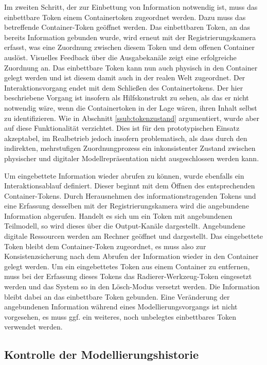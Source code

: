 Im zweiten Schritt, der zur Einbettung von Information notwendig ist, muss das einbettbare Token einem Containertoken zugeordnet werden. Dazu muss das betreffende Container-Token geöffnet werden. Das einbettbaren Token, an das bereits Information gebunden wurde, wird erneut mit der Registrierungskamera erfasst, was eine Zuordnung zwischen diesem Token und dem offenen Container auslöst. Visuelles Feedback über die Ausgabekanäle zeigt eine erfolgreiche Zuordnung an. Das einbettbare Token kann nun auch physisch in den Container gelegt werden und ist diesem damit auch in der realen Welt zugeordnet. Der Interaktionsvorgang endet mit dem Schließen des Containertokens. Der hier beschriebene Vorgang ist insofern als Hilfskonstrukt zu sehen, als das er nicht notwendig wäre, wenn die Containertoken in der Lage wären, ihren Inhalt selbst zu identifizieren. Wie in Abschnitt \ref{ssub:tokenzustand} argumentiert, wurde aber auf diese Funktionalität verzichtet. Dies ist für den prototypischen Einsatz akzeptabel, im Realbetrieb jedoch insofern problematisch, als dass durch den indirekten, mehrstufigen Zuordnungprozess ein inkonsistenter Zustand zwischen physischer und digitaler Modellrepräsentation nicht ausgeschlossen werden kann.

Um eingebettete Information wieder abrufen zu können, wurde ebenfalls ein Interaktionsablauf definiert. Dieser beginnt mit dem Öffnen des entsprechenden Container-Tokens. Durch Herausnehmen des informationstragenden Tokens und eine Erfassung desselben mit der Registrierungskamera wird die angebundene Information abgerufen. Handelt es sich um ein Token mit angebundenen Teilmodell, so wird dieses über die Output-Kanäle dargestellt. Angebundene digitale Ressourcen werden am Rechner geöffnet und dargestellt. Das eingebettete Token bleibt dem Container-Token zugeordnet, es muss also zur Konsistenzsicherung nach dem Abrufen der Information wieder in den Container gelegt werden. Um ein eingebettetes Token aus einem Container zu entfernen, muss bei der Erfassung dieses Tokens das Radierer-Werkzeug-Token eingesetzt werden und das System so in den Lösch-Modus versetzt werden. Die Information bleibt dabei an das einbettbare Token gebunden. Eine Veränderung der angebundenen Information während eines Modellierungsvorgangs ist nicht vorgesehen, es muss ggf. ein weiteres, noch unbelegtes einbettbares Token verwendet werden. 


\subsection{Kontrolle der Modellierungshistorie} %
\label{sub:kontrolle_der_modellierungshistorie}

